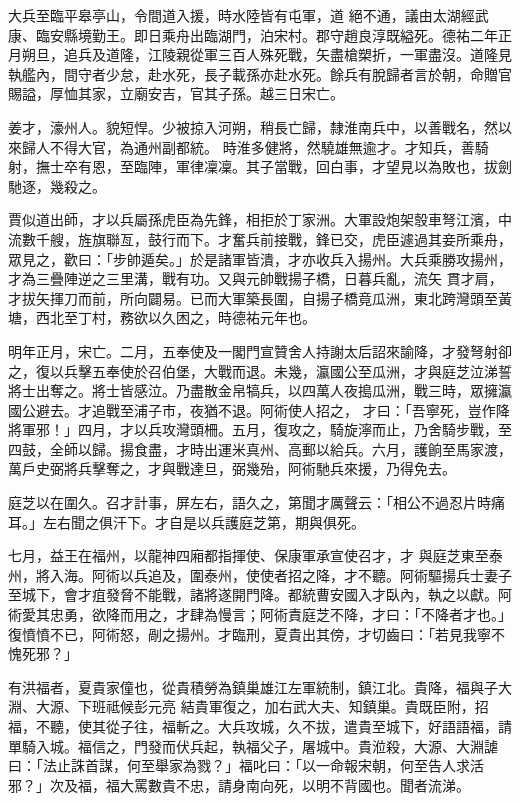 \begin{pinyinscope}
 大兵至臨平皋亭山，令間道入援，時水陸皆有屯軍，道
 絕不通，議由太湖經武康、臨安縣境勤王。即日乘舟出臨湖門，泊宋村。郡守趙良淳既縊死。德祐二年正月朔旦，追兵及道隆，江陵親從軍三百人殊死戰，矢盡槍槊折，一軍盡沒。道隆見執艦內，間守者少怠，赴水死，長子載孫亦赴水死。餘兵有脫歸者言於朝，命贈官賜謚，厚恤其家，立廟安吉，官其子孫。越三日宋亡。



 姜才，濠州人。貌短悍。少被掠入河朔，稍長亡歸，隸淮南兵中，以善戰名，然以來歸人不得大官，為通州副都統。
 時淮多健將，然驍雄無逾才。才知兵，善騎射，撫士卒有恩，至臨陣，軍律凜凜。其子當戰，回白事，才望見以為敗也，拔劍馳逐，幾殺之。



 賈似道出師，才以兵屬孫虎臣為先鋒，相拒於丁家洲。大軍設炮架彀車弩江濱，中流數千艘，旌旗聯亙，鼓行而下。才奮兵前接戰，鋒已交，虎臣遽過其妾所乘舟，眾見之，歡曰：「步帥遁矣。」於是諸軍皆潰，才亦收兵入揚州。大兵乘勝攻揚州，才為三疊陣逆之三里溝，戰有功。又與元帥戰揚子橋，日暮兵亂，流矢
 貫才肩，才拔矢揮刀而前，所向闢易。已而大軍築長圍，自揚子橋竟瓜洲，東北跨灣頭至黃塘，西北至丁村，務欲以久困之，時德祐元年也。



 明年正月，宋亡。二月，五奉使及一閣門宣贊舍人持謝太后詔來諭降，才發弩射卻之，復以兵擊五奉使於召伯堡，大戰而退。未幾，瀛國公至瓜洲，才與庭芝泣涕誓將士出奪之。將士皆感泣。乃盡散金帛犒兵，以四萬人夜搗瓜洲，戰三時，眾擁瀛國公避去。才追戰至浦子市，夜猶不退。阿術使人招之，
 才曰：「吾寧死，豈作降將軍邪！」四月，才以兵攻灣頭柵。五月，復攻之，騎旋濘而止，乃舍騎步戰，至四鼓，全師以歸。揚食盡，才時出運米真州、高郵以給兵。六月，護餉至馬家渡，萬戶史弼將兵擊奪之，才與戰達旦，弼幾殆，阿術馳兵來援，乃得免去。



 庭芝以在圍久。召才計事，屏左右，語久之，第聞才厲聲云：「相公不過忍片時痛耳。」左右聞之俱汗下。才自是以兵護庭芝第，期與俱死。



 七月，益王在福州，以龍神四廂都指揮使、保康軍承宣使召才，才
 與庭芝東至泰州，將入海。阿術以兵追及，圍泰州，使使者招之降，才不聽。阿術驅揚兵士妻子至城下，會才疽發脅不能戰，諸將遂開門降。都統曹安國入才臥內，執之以獻。阿術愛其忠勇，欲降而用之，才肆為慢言；阿術責庭芝不降，才曰：「不降者才也。」復憤憤不已，阿術怒，剮之揚州。才臨刑，夏貴出其傍，才切齒曰：「若見我寧不愧死邪？」



 有洪福者，夏貴家僮也，從貴積勞為鎮巢雄江左軍統制，鎮江北。貴降，福與子大淵、大源、下班祗候彭元亮
 結貴軍復之，加右武大夫、知鎮巢。貴既臣附，招福，不聽，使其從子往，福斬之。大兵攻城，久不拔，遣貴至城下，好語語福，請單騎入城。福信之，門發而伏兵起，執福父子，屠城中。貴涖殺，大源、大淵謔曰：「法止誅首謀，何至舉家為戮？」福叱曰：「以一命報宋朝，何至告人求活邪？」次及福，福大罵數貴不忠，請身南向死，以明不背國也。聞者流涕。




\end{pinyinscope}
